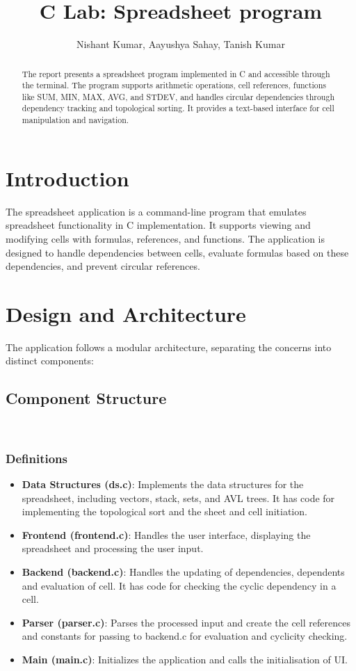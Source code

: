 \documentclass{article}
\title{C Lab: Spreadsheet program}
\author{Nishant Kumar, Aayushya Sahay, Tanish Kumar}
\begin{document}
\maketitle

\begin{abstract}
    The report presents a spreadsheet program implemented in C and accessible through the terminal. The program supports arithmetic operations, cell references, functions like SUM, MIN, MAX, AVG, and STDEV, and handles circular dependencies through dependency tracking and topological sorting. It provides a text-based interface for cell manipulation and navigation.
\end{abstract}

\tableofcontents
\newpage

\section{Introduction}
The spreadsheet application is a command-line program that emulates spreadsheet functionality in C implementation. It supports viewing and modifying cells with formulas, references, and functions. The application is designed to handle dependencies between cells, evaluate formulas based on these dependencies, and prevent circular references.

\section{Design and Architecture}
The application follows a modular architecture, separating the concerns into distinct components:

\subsection{Component Structure}
\
\subsubsection{Definitions}
\begin{itemize}
    \item \textbf{Data Structures (ds.c)}: Implements the data structures for the spreadsheet, including vectors, stack, sets, and AVL trees.
    It has code for implementing the topological sort and the sheet and cell initiation.
    \item \textbf{Frontend (frontend.c)}: Handles the user interface, displaying the spreadsheet and processing the user input.
    \item \textbf{Backend (backend.c)}: Handles the updating of dependencies, dependents and evaluation of cell. It has code for checking the cyclic dependency in a cell.
    \item \textbf{Parser (parser.c)}: Parses the processed input and create the cell references and constants for passing to backend.c for evaluation and cyclicity checking.
    \item \textbf{Main (main.c)}: Initializes the application and calls the initialisation of UI.
\end{itemize}
\end{document}
